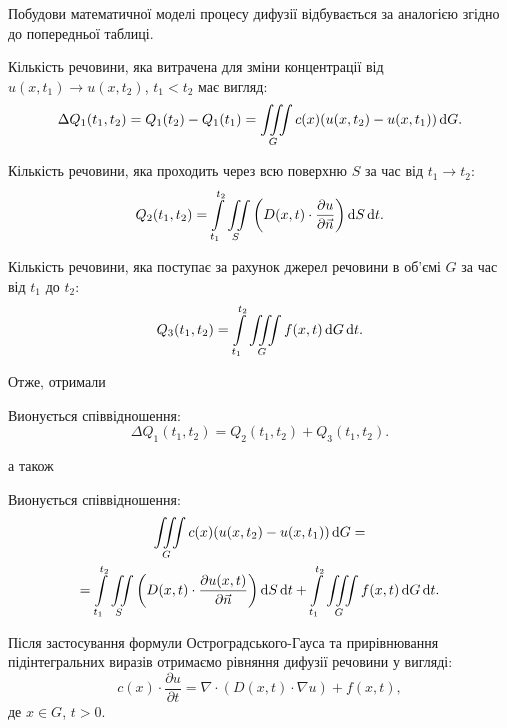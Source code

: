 Побудови математичної моделі процесу дифузії відбувається за аналогією згідно до попередньої таблиці. \medskip

Кількість речовини, яка витрачена для зміни концентрації від $u(x, t_1) \to u(x, t_2)$, $t_1 < t_2$ має вигляд:
\begin{equation}
	\Delta Q_1(t_1, t_2) = Q_1(t_2) - Q_1(t_1) = \displaystyle\iiint\limits_G c(x) (u(x, t_2) - u(x, t_1)) \mathop{}\!\mathrm{d} G.
\end{equation}

Кількість речовини, яка проходить через всю поверхню $S$ за час від $t_1 \to t_2$:
\begin{equation}
	Q_2(t_1, t_2) = \displaystyle\int\limits_{t_1}^{t_2} \displaystyle\iint\limits_S \left( D(x, t) \cdot \frac{\partial u}{\partial \vec n} \right) \mathop{}\!\mathrm{d} S \mathop{}\!\mathrm{d} t.
\end{equation}

Кількість речовини, яка поступає за рахунок джерел речовини в об'ємі $G$ за час від $t_1$ до $t_2$:
\begin{equation}
	Q_3(t_1, t_2) = \displaystyle\int\limits_{t_1}^{t_2} \displaystyle\iiint\limits_G f(x, t) \mathop{}\!\mathrm{d} G \mathop{}\!\mathrm{d} t.
\end{equation}

Отже, отримали 
\begin{theorem}
	Вионується співвідношення:
	\begin{equation}
		\Delta Q_1(t_1, t_2) = Q_2(t_1, t_2) + Q_3(t_1, t_2).
	\end{equation}
\end{theorem}
а також
\begin{theorem}
	Вионується співвідношення:
	\begin{multline}
		\displaystyle\iiint\limits_G c(x) (u(x, t_2) - u(x, t_1)) \mathop{}\!\mathrm{d} G = \\
		= \displaystyle\int\limits_{t_1}^{t_2} \displaystyle\iint\limits_S \left( D(x, t) \cdot \frac{\partial u(x, t)}{\partial \vec n} \right) \mathop{}\!\mathrm{d} S \mathop{}\!\mathrm{d} t + \displaystyle\int\limits_{t_1}^{t_2} \displaystyle\iiint\limits_G f(x, t) \mathop{}\!\mathrm{d} G \mathop{}\!\mathrm{d} t.
	\end{multline}
\end{theorem}

Після застосування формули Остроградського-Гауса та прирівнювання підінтегральних виразів отримаємо рівняння дифузії речовини у вигляді:
\begin{equation}
	c(x) \cdot \frac{\partial u}{\partial t} = \nabla \cdot (D(x, t) \cdot \nabla u) + f(x, t),
\end{equation}
де $x \in G$, $t > 0$. \medskip

